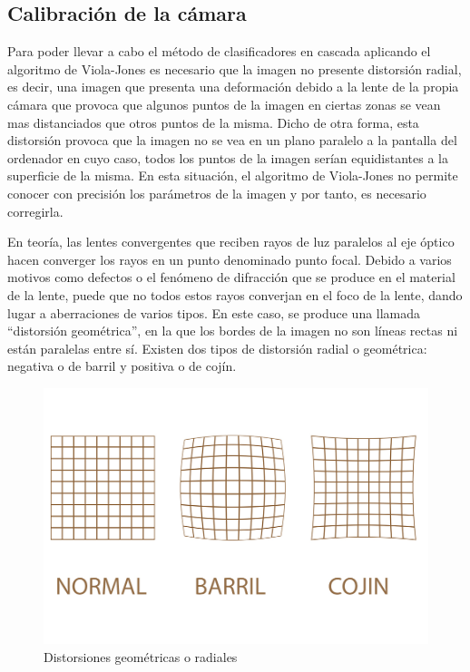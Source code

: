 \subsection{Calibración de la cámara} \label{s2_2_3}

Para poder llevar a cabo el método de clasificadores en cascada aplicando el algoritmo de Viola-Jones es necesario que 
la imagen no presente distorsión radial, es decir, una imagen que presenta una deformación debido a la lente de la propia cámara que provoca que algunos puntos de la imagen en ciertas zonas se vean mas distanciados que otros puntos de la misma. Dicho de otra forma, esta distorsión provoca que la imagen no se vea en un plano paralelo a la pantalla del ordenador en cuyo caso, todos los puntos de la imagen serían equidistantes a la superficie de la misma. En esta situación, el algoritmo de Viola-Jones no permite conocer con precisión los parámetros de la imagen y por tanto, es necesario corregirla.

En teoría, las lentes convergentes que reciben rayos de luz paralelos al eje óptico hacen converger los rayos en un punto denominado punto focal. Debido a varios motivos como defectos o el fenómeno de difracción que se produce en el material de la lente, puede que no todos estos rayos converjan en el foco de la lente, dando lugar a aberraciones de varios tipos. En este caso, se produce una llamada ``distorsión geométrica'', en la que los bordes de la imagen no son líneas rectas ni están paralelas entre sí. Existen dos tipos de distorsión radial o geométrica: negativa o de barril y positiva o de cojín.

\begin{figure}
\centering
\includegraphics[scale = 0.3]{capitulo_02/figuras_dir/distorsion.jpg}
\caption{Distorsiones geométricas o radiales}
\end{figure}

